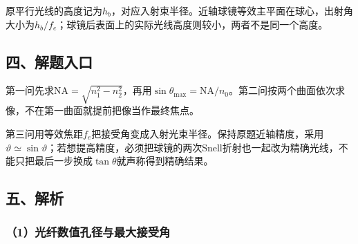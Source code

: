 \documentclass[12pt,a4paper,fontset=fandol]{ctexart}
\begin{document}
\begin{center}
\begin{minipage}{\linewidth}
\centering\begingroup{}
\ifdim\wd\diagrambox>.88\linewidth
\sbox{\diagrambox}{\resizebox{.88\linewidth}{!}{\usebox{\diagrambox}}}\fi
\ifdim\ht\diagrambox>.38\textheight
\resizebox{!}{.38\textheight}{\usebox{\diagrambox}}
\else\usebox{\diagrambox}\fi
\par{}\endgroup\end{minipage}\end{center}

原平行光线的高度记为\(h_b\)，对应入射束半径。近轴球镜等效主平面在球心，出射角大小为\(h_b/f_e\)；球镜后表面上的实际光线高度则较小，两者不是同一个高度。

\subsection{四、解题入口}\label{ux56dbux89e3ux9898ux5165ux53e3-4}

第一问先求\(\mathrm{NA}=\sqrt{n_1^2-n_2^2}\)，再用\(\sin\theta_{\max}=\mathrm{NA}/n_0\)。第二问按两个曲面依次求像，不在第一曲面就提前把像当作最终焦点。

第三问用等效焦距\(f_e\)把接受角变成入射光束半径。保持原题近轴精度，采用\(\vartheta\simeq\sin\vartheta\)；若想提高精度，必须把球镜的两次Snell折射也一起改为精确光线，不能只把最后一步换成\(\tan\theta\)就声称得到精确结果。

\subsection{五、解析}\label{ux4e94ux89e3ux6790-4}

\subsubsection{（1）光纤数值孔径与最大接受角}\label{ux5149ux7ea4ux6570ux503cux5b54ux5f84ux4e0eux6700ux5927ux63a5ux53d7ux89d2}
\end{document}
